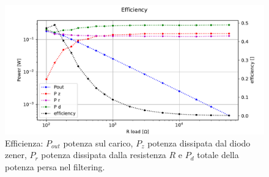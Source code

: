 \begin{figure}[H]
\centering
\includegraphics[width=\textwidth]{fig7.pdf}
\caption{Efficienza: $P_{out}$ potenza sul carico, $P_{z}$ potenza dissipata dal diodo zener, $P_{r}$ potenza dissipata dalla resistenza $R$ e $P_{d}$ totale della potenza persa nel filtering.}
\label{fig:eff}
\end{figure}










